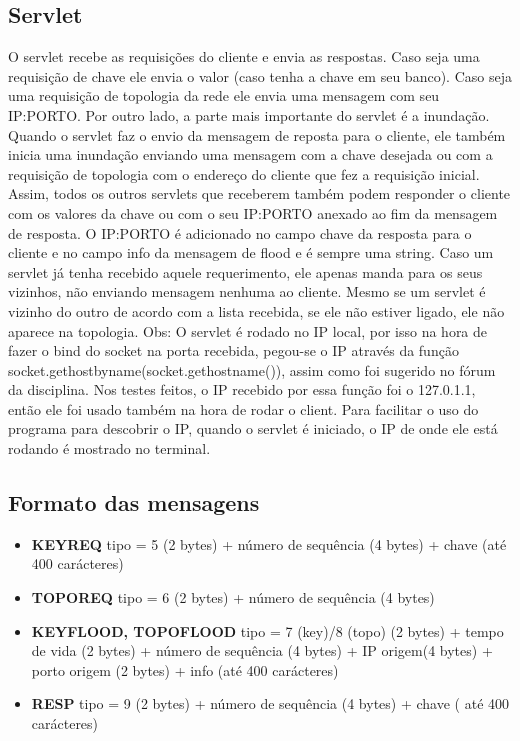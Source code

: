 \documentclass[10pt]{article}
\begin{document}
		\subsection{Servlet}
			O servlet recebe as requisições do cliente e envia as respostas. Caso seja uma requisição de chave ele envia o valor (caso tenha a chave em seu banco). Caso seja uma requisição de topologia da rede ele envia uma mensagem com seu IP:PORTO.
			Por outro lado, a parte mais importante do servlet é a inundação. Quando o servlet faz o envio da mensagem de reposta para o cliente, ele também inicia uma inundação enviando uma mensagem com a chave desejada ou com a requisição de topologia com o endereço do cliente que fez a requisição inicial. Assim, todos os outros servlets que receberem também podem responder o cliente com os valores da chave ou com o seu IP:PORTO anexado ao fim da mensagem de resposta. O IP:PORTO é adicionado no campo chave da resposta para o cliente e no campo info da mensagem de flood e é sempre uma string. Caso um servlet já tenha recebido aquele requerimento, ele apenas manda para os seus vizinhos, não enviando mensagem nenhuma ao cliente.
			\newline Mesmo se um servlet é vizinho do outro de acordo com a lista recebida, se ele não estiver ligado, ele não aparece na topologia.
			\newline Obs: O servlet é rodado no IP local, por isso na hora de fazer o bind do socket na porta recebida, pegou-se o IP através da função socket.gethostbyname(socket.gethostname()), assim como foi sugerido no fórum da disciplina. Nos testes feitos, o IP recebido por essa função foi o 127.0.1.1, então ele foi usado também na hora de rodar o client.
			\newline Para facilitar o uso do programa para descobrir o IP, quando o servlet é iniciado, o IP de onde ele está rodando é mostrado no terminal.
		\subsection{Formato das mensagens}
\begin{itemize}

\item \textbf{KEYREQ} tipo = 5 (2 bytes) + número de sequência (4 bytes) + chave (até 400 carácteres)
\item \textbf{TOPOREQ} tipo = 6 (2 bytes) + número de sequência (4 bytes) 
\item \textbf{KEYFLOOD, TOPOFLOOD} tipo = 7 (key)/8 (topo) (2 bytes) + tempo de vida (2 bytes) + número de sequência (4 bytes) + IP origem(4 bytes) + porto origem (2 bytes) + info (até 400 carácteres)
\item \textbf{RESP} tipo = 9 (2 bytes) + número de sequência (4 bytes) + chave ( até 400 carácteres)
\end{itemize}
\end{document}
